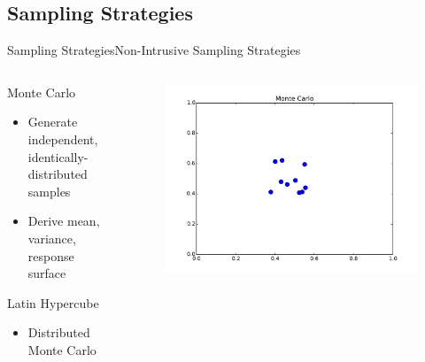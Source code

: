 \documentclass{beamer}
\begin{document}
\subsection{Sampling Strategies}
\begin{frame}{Sampling Strategies}{Non-Intrusive Sampling Strategies}
  \vspace{-20pt}
  \begin{columns}
  \begin{column}{0.6\textwidth}
  Monte Carlo
    \begin{itemize}
      \item Generate independent, identically-distributed samples
      \item Derive mean, variance, response surface
    \end{itemize}
  Latin Hypercube
    \begin{itemize}
      \item Distributed Monte Carlo
    \end{itemize}
  \end{column}
  \begin{column}{0.4\textwidth}
    \begin{figure}[h!]
      \centering
        \includegraphics[width=\textwidth]{../../graphics/mc}
      \end{figure} \vspace{-20pt}
    \begin{figure}[h!]
      \centering

\end{figure}
\end{column}
\end{columns}
\end{frame}
\end{document}
